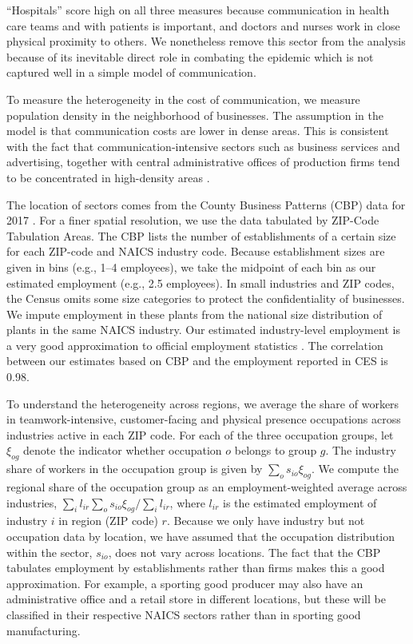 ``Hospitals'' score high on all three measures because communication in health care teams and with patients is important, and doctors and nurses work in close physical proximity to others. We nonetheless remove this sector from the analysis because of its inevitable direct role in combating the epidemic which is not captured well in a simple model of communication.

To measure the heterogeneity in the cost of communication, we measure population density in the neighborhood of businesses. The assumption in the model is that communication costs are lower in dense areas. This is consistent with the fact that communication-intensive sectors such as business services and advertising, together with central administrative offices of production firms tend to be concentrated in high-density areas \cite{Aarland2007-dh}.

The location of sectors comes from the County Business Patterns (CBP) data for 2017 \cite{CBP}. For a finer spatial resolution, we use the data tabulated by ZIP-Code Tabulation Areas. The CBP lists the number of establishments of a certain size for each ZIP-code and NAICS industry code. Because establishment sizes are given in bins (e.g., 1--4 employees), we take the midpoint of each bin as our estimated employment (e.g., 2.5 employees). In small industries and ZIP codes, the Census omits some size categories to protect the confidentiality of businesses. We impute employment in these plants from the national size distribution of plants in the same NAICS industry. Our estimated industry-level employment is a very good approximation to official employment statistics \cite{CES}. The correlation between our estimates based on CBP and the employment reported in CES is 0.98.

To understand the heterogeneity across regions, we average the share of workers in teamwork-intensive, customer-facing and physical presence occupations across industries active in each ZIP code. For each of the three occupation groups, let $\xi_{og}$ denote the indicator whether occupation $o$ belongs to group $g$. The industry share of workers in the occupation group is given by $\sum_o s_{io}\xi_{og}$. We compute the regional share of the occupation group as an employment-weighted average across industries, $\sum_i l_{ir}\sum_o s_{io}\xi_{og}/\sum_i l_{ir}$, where $l_{ir}$ is the estimated employment of industry $i$ in region (ZIP code) $r$. Because we only have industry but not occupation data by location, we have assumed that the occupation distribution within the sector, $s_{io}$, does not vary across locations. The fact that the CBP tabulates employment by establishments rather than firms makes this a good approximation. For example, a sporting good producer may also have an administrative office and a retail store in different locations, but these will be classified in their respective NAICS sectors rather than in sporting good manufacturing.

